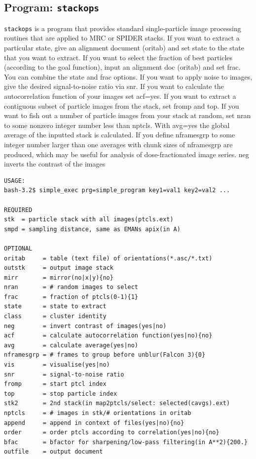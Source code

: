 \documentclass[a4paper,11pt]{article}
\newcommand{\prgname}[1]{\textcolor{NavyBlue}{\texttt{#1}}}
\begin{document}
\subsection{Program: \prgname{stackops}}
\label{stackops}
\prgname{stackops} is a program that provides standard single-particle image processing routines that are applied to MRC or SPIDER stacks. If you want to extract a particular state, give an alignment document (oritab) and set state to the state that you want to extract. If you want to select the fraction of best particles (according to the goal function), input an alignment doc (oritab) and set frac. You can combine the state and frac options. If you want to apply noise to images, give the desired signal-to-noise ratio via snr. If you want to calculate the autocorrelation function of your images set acf=yes. If you want to extract a contiguous subset of particle images from the stack, set fromp and top. If you want to fish out a number of particle images from your stack at random, set nran to some nonzero integer number less than nptcls. With avg=yes the global average of the inputted stack is calculated. If you define nframesgrp to some integer number larger than one averages with chunk sizes of nframesgrp are produced, which may be useful for analysis of dose-fractionated image series. neg inverts the contrast of the images

\begin{verbatim}
USAGE:
bash-3.2$ simple_exec prg=simple_program key1=val1 key2=val2 ...

REQUIRED
stk  = particle stack with all images(ptcls.ext)
smpd = sampling distance, same as EMANs apix(in A)

OPTIONAL
oritab     = table (text file) of orientations(*.asc/*.txt)
outstk     = output image stack
mirr       = mirror(no|x|y){no}
nran       = # random images to select
frac       = fraction of ptcls(0-1){1}
state      = state to extract
class      = cluster identity
neg        = invert contrast of images(yes|no)
acf        = calculate autocorrelation function(yes|no){no}
avg        = calculate average(yes|no)
nframesgrp = # frames to group before unblur(Falcon 3){0}
vis        = visualise(yes|no)
snr        = signal-to-noise ratio
fromp      = start ptcl index
top        = stop particle index
stk2       = 2nd stack(in map2ptcls/select: selected(cavgs).ext)
nptcls     = # images in stk/# orientations in oritab
append     = append in context of files(yes|no){no}
order      = order ptcls according to correlation(yes|no){no}
bfac       = bfactor for sharpening/low-pass filtering(in A**2){200.}
outfile    = output document
\end{verbatim}
\end{document}

